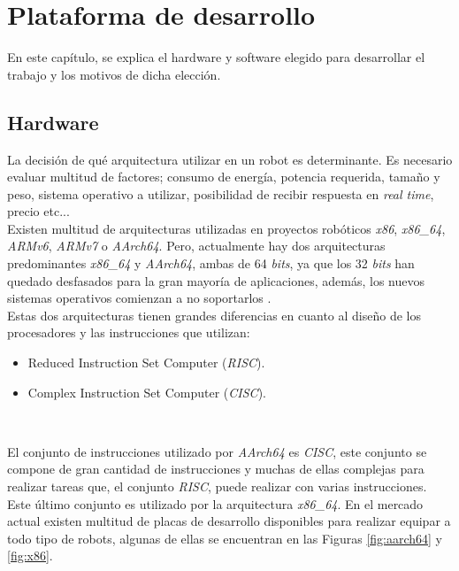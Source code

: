 \chapter{Plataforma de desarrollo}
\label{cap:capitulo3}
En este capítulo, se explica el hardware y software elegido para desarrollar el trabajo y los motivos de dicha elección.\\

\section{Hardware}
\label{sec:arquitectura}
La decisión de qué arquitectura utilizar en un robot es determinante. Es necesario evaluar multitud de factores; consumo de energía, potencia requerida, tamaño y peso, sistema operativo a utilizar, posibilidad de recibir respuesta en \textit{real time}, precio etc...\\

Existen multitud de arquitecturas utilizadas en proyectos robóticos \textit{x86}, \textit{x86\_64}, \textit{ARMv6}, \textit{ARMv7} o \textit{AArch64}. Pero, actualmente hay dos arquitecturas predominantes \textit{x86\_64} y \textit{AArch64}, ambas de 64 \textit{bits}, ya que los 32 \textit{bits} han quedado desfasados para la gran mayoría de aplicaciones, además, los nuevos sistemas operativos comienzan a no soportarlos \cite{canonical32bits}.\\ 

Estas dos arquitecturas tienen grandes diferencias en cuanto al diseño de los procesadores y las instrucciones que utilizan:
\begin{itemize}
	\item Reduced Instruction Set Computer (\textit{RISC}).
	\item Complex Instruction Set Computer (\textit{CISC}).
\end{itemize}\

El conjunto de instrucciones utilizado por \textit{AArch64} es \textit{CISC}, este conjunto se compone de gran cantidad de instrucciones y muchas de ellas complejas para realizar tareas que, el conjunto \textit{RISC}, puede realizar con varias instrucciones. Este último conjunto es utilizado por la arquitectura \textit{x86\_64}. En el mercado actual existen multitud de placas de desarrollo disponibles para realizar equipar a todo tipo de robots, algunas de ellas se encuentran en las Figuras \ref{fig:aarch64} y \ref{fig:x86}.\\

